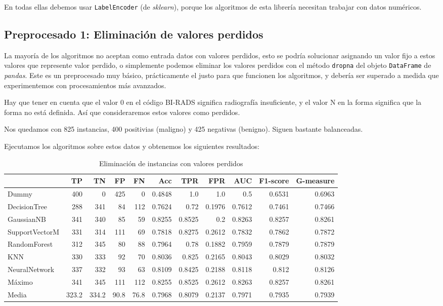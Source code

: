 \documentclass{article}
\begin{document}
En todas ellas debemos usar \texttt{LabelEncoder} (de
\textit{sklearn}), porque los algoritmos de esta librería necesitan
trabajar con datos numéricos.

\subsection{Preprocesado 1: Eliminación de valores perdidos}

La mayoría de los algoritmos no aceptan como entrada datos con valores
perdidos, esto se podría solucionar asignando un valor fijo a estos
valores que represente valor perdido, o simplemente podemos eliminar
los valores perdidos con el método \texttt{dropna} del objeto
\texttt{DataFrame} de \textit{pandas}. Este es un preprocesado muy
básico, prácticamente el justo para que funcionen los algoritmos, y
debería ser superado a medida que experimentemos con procesamientos
más avanzados.

Hay que tener en cuenta que el valor 0 en el código BI-RADS significa
radiografía insuficiente, y el valor N en la forma significa que la
forma no está definida. Así que consideraremos estos valores como
perdidos.

Nos quedamos con 825 instancias, 400 positivias (maligno) y 425
negativas (benigno). Siguen bastante balanceadas.

Ejecutamos los algoritmos sobre estos datos y obtenemos los siguientes
resultados:

\begin{table}[H]
\centering
\caption{Eliminación de instancias con valores perdidos}
\label{tab:dropna}
\begin{tabular}{|lrrrrrrrrrr|}
\hline
 & TP & TN & FP & FN & Acc & TPR & FPR & AUC & F1-score & G-measure\\ \hline
Dummy & 400 & 0 & 425 & 0 & 0.4848 & 1.0 & 1.0 & 0.5 & 0.6531 & 0.6963\\
DecisionTree & 288 & 341 & 84 & 112 & 0.7624 & 0.72 & 0.1976 & 0.7612 & 0.7461 & 0.7466\\
GaussianNB & 341 & 340 & 85 & 59 & 0.8255 & 0.8525 & 0.2 & 0.8263 & 0.8257 & 0.8261\\
SupportVectorM & 331 & 314 & 111 & 69 & 0.7818 & 0.8275 & 0.2612 & 0.7832 & 0.7862 & 0.7872\\
RandomForest & 312 & 345 & 80 & 88 & 0.7964 & 0.78 & 0.1882 & 0.7959 & 0.7879 & 0.7879\\
KNN & 330 & 333 & 92 & 70 & 0.8036 & 0.825 & 0.2165 & 0.8043 & 0.8029 & 0.8032\\
NeuralNetwork & 337 & 332 & 93 & 63 & 0.8109 & 0.8425 & 0.2188 & 0.8118 & 0.812 & 0.8126\\ \hline
Máximo & 341 & 345 & 111 & 112 & 0.8255 & 0.8525 & 0.2612 & 0.8263 & 0.8257 & 0.8261\\
Media & 323.2 & 334.2 & 90.8 & 76.8 & 0.7968 & 0.8079 & 0.2137 & 0.7971 & 0.7935 & 0.7939\\
\hline
\end{tabular}
\end{table}
\end{document}
